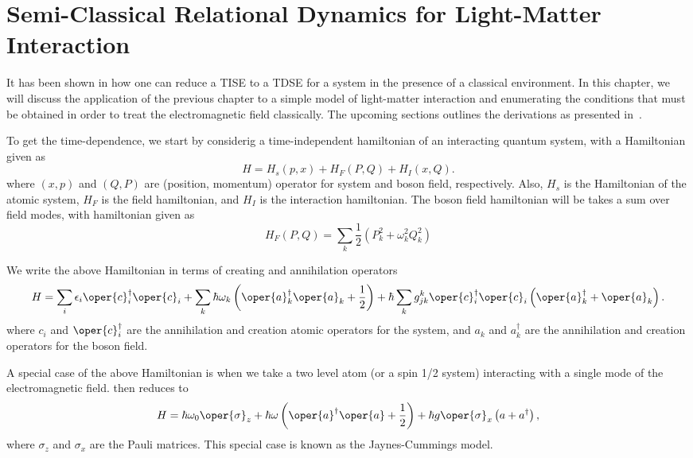 \chapter{Semi-Classical Relational Dynamics for Light-Matter Interaction
\label{chap:braun_briggs_jaynes}}

It has been shown in  how one can reduce a TISE 
to a TDSE for a system in the presence of a classical environment. In this chapter, 
we will discuss the application of the previous chapter to a simple model of light-matter 
interaction and enumerating the conditions that must be obtained in order to treat the 
electromagnetic field classically. The upcoming sections outlines the derivations as presented 
in~\cite{braun2004classical}. 

To get the time-dependence, we start by considerig a time-independent hamiltonian of an interacting quantum system,
with a Hamiltonian given as
\begin{equation}
    H = H_s(p, x) + H_F(P, Q) + H_I(x, Q). 
\end{equation}
where $(x, p)$ and $(Q, P)$ are (position, momentum) operator for system and boson field, respectively. 
Also, $H_s$ is the Hamiltonian of the atomic system, $H_F$ is the field hamiltonian, and $H_I$ is the interaction hamiltonian. 
The boson field hamiltonian will be takes a sum over field modes, with hamiltonian given as 
\begin{equation}
    H_F(P, Q) = \sum_{k} \frac{1}{2}\left(P_k ^2 + \omega_k^2 Q_k^2\right)
\end{equation}

We write the above Hamiltonian in terms of creating and annihilation operators
\begin{equation}
    \label{eq:class_jcm_eq1}
    H = \sum_i \epsilon_i \oper{c}^\dagger _i \oper{c}_i + \sum_k \hbar \omega_k \left(\oper{a}^\dagger _k \oper{a}_k 
    + \frac{1}{2}\right) + \hbar\sum_k  g_{jk}^k \oper{c}^\dagger _i \oper{c}_i\left(\oper{a}^\dagger _k + \oper{a}_k \right).
\end{equation}
where $c_i$ and $\oper{c}^\dagger _i$ are the annihilation and creation atomic operators for the system, 
and $a_k$ and $a^\dagger _k$ are the annihilation and creation operators for the boson field.

A special case of the above Hamiltonian is when we take a two level atom (or a spin 1/2 system)
interacting with a single mode of the electromagnetic field.  then reduces to
\begin{eqnarray}
    \label{eq:class_jcm_eq2}
    H = \hbar \omega_0 \oper{\sigma}_z + \hbar \omega \left(\oper{a}^\dagger \oper{a} + \frac{1}{2}\right) 
    + \hbar g \oper{\sigma}_x\left(a + a^\dagger\right),
\end{eqnarray}
where $\sigma_z$ and $\sigma_x$ are the Pauli matrices. 
This special case is known as the Jaynes-Cummings model.
